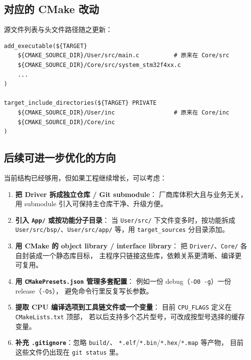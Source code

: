 \subsection{对应的 CMake 改动}

源文件列表与头文件路径随之更新：

\begin{lstlisting}[style=generic]
add_executable(${TARGET}
    ${CMAKE_SOURCE_DIR}/User/src/main.c          # 原来在 Core/src
    ${CMAKE_SOURCE_DIR}/Core/src/system_stm32f4xx.c
    ...
)

target_include_directories(${TARGET} PRIVATE
    ${CMAKE_SOURCE_DIR}/User/inc                 # 原来在 Core/inc
    ${CMAKE_SOURCE_DIR}/Core/inc
)
\end{lstlisting}

\subsection{后续可进一步优化的方向}

当前结构已经够用，但如果工程继续增长，可以考虑：

\begin{enumerate}
  \item \textbf{把 Driver 拆成独立仓库 / Git submodule}：
        厂商库体积大且与业务无关，用 submodule 引入可保持主仓库干净、升级方便。
  \item \textbf{引入 \texttt{App/} 或按功能分子目录}：
        当 \texttt{User/src/} 下文件变多时，按功能拆成
        \texttt{User/src/bsp/}、\texttt{User/src/app/} 等，用
        \texttt{target\_sources} 分目录添加。
  \item \textbf{用 CMake 的 object library / interface library}：
        把 \texttt{Driver/}、\texttt{Core/} 各自封装成一个静态库目标，
        主程序只链接这些库，依赖关系更清晰、编译更可复用。
  \item \textbf{用 \texttt{CMakePresets.json} 管理多套配置}：
        例如一份 debug（\texttt{-O0 -g}）一份 release（\texttt{-Os}），
        避免命令行里反复写长参数。
  \item \textbf{提取 CPU 编译选项到工具链文件或一个变量}：
        目前 \texttt{CPU\_FLAGS} 定义在 \texttt{CMakeLists.txt} 顶部，
        若以后支持多个芯片型号，可改成按型号选择的缓存变量。
  \item \textbf{补充 \texttt{.gitignore}}：忽略 \texttt{build/}、
        \texttt{*.elf}/\texttt{*.bin}/\texttt{*.hex}/\texttt{*.map} 等产物，
        目前这些文件仍出现在 \texttt{git status} 里。
\end{enumerate}
